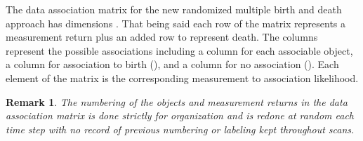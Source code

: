 \documentclass[10pt, conference]{IEEEtran}
\newtheorem{remark}{Remark}
\begin{document}
The data association matrix for the new randomized multiple birth and death approach has dimensions . That being said each row of the matrix represents a measurement return plus an added row to represent death. The columns represent the possible associations including a column for each associable object, a column for association to birth (), and a column for no association (). Each element of the matrix is the corresponding measurement to association likelihood.
\begin{remark}
The numbering of the objects and measurement returns in the data association matrix is done strictly for organization and is redone at random each time step with no record of previous numbering or labeling kept throughout scans. 
\end{remark}
\end{document}
